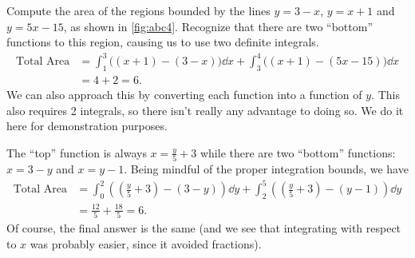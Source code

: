 \begin{example}\label{ex_abc4}
Compute the area of the regions bounded by the lines
$y=3-x$, $y=x+1$ and $y=5x-15$, as shown in \autoref{fig:abc4}.
\solution
Recognize that there are two ``bottom'' functions to this region, causing us to use two definite integrals.
\begin{align*}
	\text{Total Area}
	&= \int_1^3\bigl((x+1)-(3-x)\bigr)\dd x + \int_3^4\bigl((x+1)-(5x-15)\bigr)\dd x \\
	&= 4+2
	= 6.
\end{align*}
We can also approach this by converting each function into a function of $y$. This also requires 2 integrals, so there isn't really any advantage to doing so. We do it here for demonstration purposes.

The ``top'' function is always $x=\frac y5+3$ while there are two ``bottom'' functions: $x=3-y$ and $x=y-1$. Being mindful of the proper integration bounds, we have
\begin{align*}
	\text{Total Area}
	&= \int_0^2\left(\left(\frac y5+3\right) - (3-y)\right)\dd y
	+ \int_2^5\left(\left(\frac y5+3\right) - (y-1)\right)\dd y \\
	&= \frac{12}5 + \frac{18}5
	= 6.
\end{align*}
Of course, the final answer is the same (and we see that integrating with respect to $x$ was probably easier, since it avoided fractions).
\end{example}

